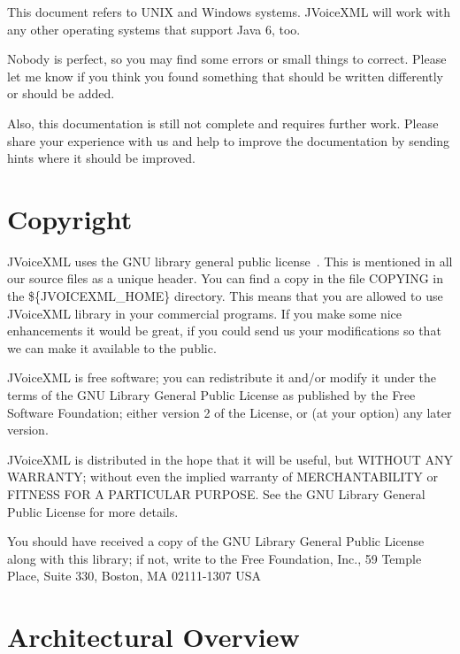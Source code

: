 \documentclass[11pt,a4paper]{book}
\begin{document}
This document refers to UNIX and Windows systems. JVoiceXML will work with 
any other operating systems that support Java 6, too.

Nobody is perfect, so you may find some errors or small things to correct.
Please let me know if you think you found something that should be written
differently or should be added.

Also, this documentation is still not complete and requires further work.
Please share your experience with us and help to improve the documentation by
sending hints where it should be improved.

\section{Copyright}
\label{sec:copyright}

JVoiceXML uses the GNU library general public license~\cite{gnu:lgpg}. 
This is mentioned in all our source files as a unique header.
You can find a copy in the file COPYING in the \$\{JVOICEXML\_HOME\}
directory. This means that you are allowed to use JVoiceXML
library in your commercial programs. If you make some nice
enhancements it would be great, if you could send us your
modifications so that we can make it available to the public.

\medskip 

JVoiceXML is free software; you can redistribute it and/or
modify it under the terms of the GNU Library General Public
License as published by the Free Software Foundation; either
version 2 of the License, or (at your option) any later version.

JVoiceXML is distributed in the hope that it will be useful,
but WITHOUT ANY WARRANTY; without even the implied warranty of
MERCHANTABILITY or FITNESS FOR A PARTICULAR PURPOSE. See the GNU
Library General Public License for more details.

You should have received a copy of the GNU Library General Public
License along with this library; if not, write to the Free
Foundation, Inc., 59 Temple Place, Suite 330, Boston, MA  02111-1307  USA

\section{Architectural Overview}
\label{sec:arch-overv}
\end{document}
